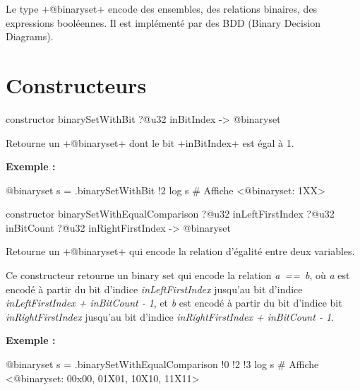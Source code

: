 



Le type \ggsq+@binaryset+ encode des ensembles, des relations binaires, des expressions booléennes. Il est implémenté par des BDD (Binary Decision Diagrams).


\section{Constructeurs}


\begin{galgas4box}
constructor binarySetWithBit ?@u32 inBitIndex -> @binaryset
\end{galgas4box}


Retourne un \ggsq+@binaryset+ dont le bit \ggsq+inBitIndex+ est égal à 1.


\textbf{Exemple :}
\begin{galgas4}
@binaryset s = .binarySetWithBit {!2}
log s # Affiche <@binaryset: 1XX>
\end{galgas4}



\begin{galgas4box}
constructor binarySetWithEqualComparison
  ?@u32 inLeftFirstIndex
  ?@u32 inBitCount
  ?@u32 inRightFirstIndex
  -> @binaryset
\end{galgas4box}




Retourne un \ggsq+@binaryset+ qui encode la relation d'égalité entre deux variables.

Ce constructeur retourne un binary set qui encode la relation \emph{a~==~b}, où \emph{a} est encodé à partir du bit d'indice \emph{inLeftFirstIndex} jusqu'au bit d'indice \emph{inLeftFirstIndex  + inBitCount - 1}, et \emph{b} est encodé à partir du bit d'indice bit \emph{inRightFirstIndex} jusqu'au bit d'indice \emph{inRightFirstIndex + inBitCount - 1}.

\textbf{Exemple :}
\begin{galgas4}
@binaryset s = .binarySetWithEqualComparison {!0 !2 !3}
log s # Affiche <@binaryset: 00x00, 01X01, 10X10, 11X11>
\end{galgas4}




